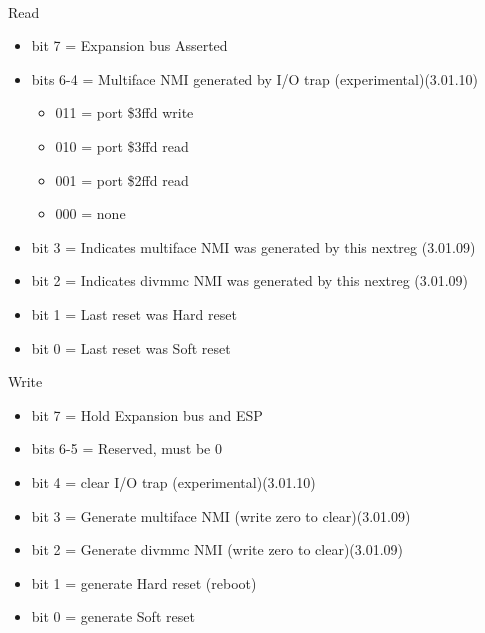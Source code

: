 \\
Read
\begin{itemize}
\item bit 7 = Expansion bus  Asserted
\item bits 6-4 = Multiface NMI generated by I/O trap (experimental)(3.01.10)
\begin{itemize}
\item[] 011 = port \$3ffd write
\item[] 010 = port \$3ffd read
\item[] 001 = port \$2ffd read
\item[] 000 = none
\end{itemize}
\item bit 3 = Indicates multiface NMI was generated by this nextreg (3.01.09)
\item bit 2 = Indicates divmmc NMI was generated by this nextreg (3.01.09)
\item bit 1 = Last reset was Hard reset
\item bit 0 = Last reset was Soft reset
\end{itemize}
Write
\begin{itemize}
\item bit 7 = Hold Expansion bus and ESP 
\item bits 6-5 = Reserved, must be 0
\item bit 4 = clear I/O trap (experimental)(3.01.10)
\item bit 3 = Generate multiface NMI (write zero to clear)(3.01.09)
\item bit 2 = Generate divmmc NMI (write zero to clear)(3.01.09)
\item bit 1 = generate Hard reset (reboot)
\item bit 0 = generate Soft reset
\end{itemize}

